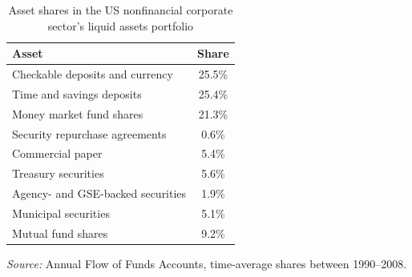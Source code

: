 \begin{table}[htb]

	\setlength\tabcolsep{5.2pt}
	\centering
	\caption{Asset shares in the US nonfinancial corporate sector's liquid assets portfolio} \label{Tab_Appx_Data_FoFashares}
	\begin{tabular}{lc}
		\hline \hline
		Asset & Share \\
		\hline
        Checkable deposits and currency & 25.5\% \\
        Time and savings deposits & 25.4\% \\
        Money market fund shares & 21.3\% \\
        Security repurchase agreements & 0.6\% \\
        Commercial paper & 5.4\% \\
        Treasury securities & 5.6\% \\
        Agency- and GSE-backed securities & 1.9\% \\
        Municipal securities & 5.1\% \\
        Mutual fund shares & 9.2\% \\
		\hline \hline
	\end{tabular}

	\vspace{2pt}
	\begin{minipage}{\textwidth}
		{\footnotesize \emph{Source:} Annual Flow of Funds Accounts, time-average shares between 1990--2008.}
	\end{minipage}
\end{table}